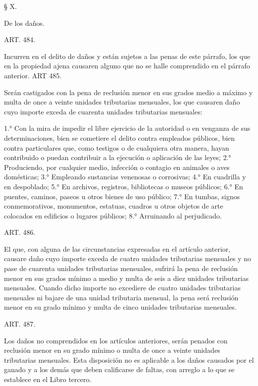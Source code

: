     § X.

    De los daños.





    ART. 484.

    Incurren en el delito de daños y están sujetos a las penas de este párrafo, los que en la propiedad ajena causaren alguno que no se halle comprendido en el párrafo anterior.
    ART 485.

    Serán castigados con la pena de reclusión menor en sus grados medio a máximo y multa de once a veinte unidades tributarias mensuales, los que causaren daño cuyo importe exceda de cuarenta unidades tributarias mensuales:

    1.° Con la mira de impedir el libre ejercicio de la autoridad o en venganza de sus determinaciones, bien se cometiere el delito contra empleados públicos, bien contra particulares que, como testigos o de cualquiera otra manera, hayan contribuido o puedan contribuir a la ejecución o aplicación de las leyes;
    2.° Produciendo, por cualquier medio, infección o contagio en animales o aves domésticas;
    3.° Empleando sustancias venenosas o corrosivas;
    4.° En cuadrilla y en despoblado;
    5.° En archivos, registros, bibliotecas o museos públicos;
    6.° En puentes, caminos, paseos u otros bienes de uso público;
    7.° En tumbas, signos conmemorativos, monumentos, estatuas, cuadros u otros objetos de arte colocados en edificios o lugares públicos;
    8.° Arruinando al perjudicado.


    ART. 486.

    El que, con alguna de las circunstancias expresadas en el artículo anterior, causare daño cuyo importe exceda de cuatro unidades tributarias mensuales y no pase de cuarenta unidades tributarias mensuales, sufrirá la pena de reclusión menor en sus grados mínimo a medio y multa de seis a diez unidades tributarias mensuales.
    Cuando dicho importe no excediere de cuatro unidades tributarias mensuales ni bajare de una unidad tributaria mensual, la pena será reclusión menor en su grado mínimo y multa de cinco unidades tributarias mensuales.


    ART. 487.

    Los daños no comprendidos en los artículos anteriores, serán penados con reclusión menor en su grado mínimo o multa de once a veinte unidades tributarias mensuales.
    Esta disposición no es aplicable a los daños causados por el ganado y a los demás que deben calificarse de faltas, con arreglo a lo que se establece en el Libro tercero.






